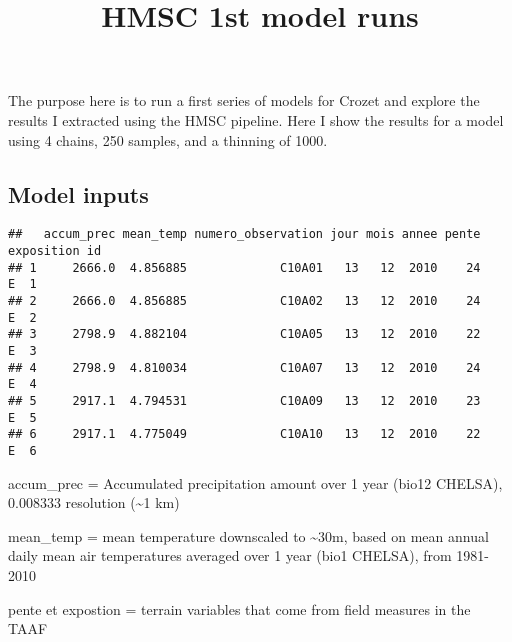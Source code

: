 \documentclass[
]{article}
\title{HMSC 1st model runs}
\author{}
\date{\vspace{-2.5em}}
\newenvironment{Shaded}{\begin{snugshade}}{\end{snugshade}}
\newcommand{\AttributeTok}[1]{\textcolor[rgb]{0.77,0.63,0.00}{#1}}
\newcommand{\CommentTok}[1]{\textcolor[rgb]{0.56,0.35,0.01}{\textit{#1}}}
\newcommand{\FunctionTok}[1]{\textcolor[rgb]{0.00,0.00,0.00}{#1}}
\newcommand{\NormalTok}[1]{#1}
\newcommand{\OtherTok}[1]{\textcolor[rgb]{0.56,0.35,0.01}{#1}}
\newcommand{\SpecialCharTok}[1]{\textcolor[rgb]{0.00,0.00,0.00}{#1}}
\newcommand{\StringTok}[1]{\textcolor[rgb]{0.31,0.60,0.02}{#1}}
\begin{document}
\maketitle

The purpose here is to run a first series of models for Crozet and
explore the results I extracted using the HMSC pipeline. Here I show the
results for a model using 4 chains, 250 samples, and a thinning of 1000.

\hypertarget{model-inputs}{%
\subsection{Model inputs}\label{model-inputs}}

\begin{Shaded}
\end{Shaded}

\begin{verbatim}
##   accum_prec mean_temp numero_observation jour mois annee pente exposition id
## 1     2666.0  4.856885             C10A01   13   12  2010    24          E  1
## 2     2666.0  4.856885             C10A02   13   12  2010    24          E  2
## 3     2798.9  4.882104             C10A05   13   12  2010    22          E  3
## 4     2798.9  4.810034             C10A07   13   12  2010    24          E  4
## 5     2917.1  4.794531             C10A09   13   12  2010    23          E  5
## 6     2917.1  4.775049             C10A10   13   12  2010    22          E  6
\end{verbatim}

accum\_prec = Accumulated precipitation amount over 1 year (bio12
CHELSA), 0.008333 resolution (\textasciitilde1 km)

mean\_temp = mean temperature downscaled to \textasciitilde30m, based on
mean annual daily mean air temperatures averaged over 1 year (bio1
CHELSA), from 1981-2010

pente et expostion = terrain variables that come from field measures in
the TAAF
\end{document}

